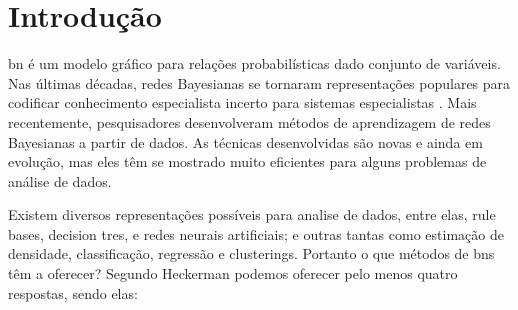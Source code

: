 \chapter{Introdução}%
\gls{bn} é um modelo gráfico para relações probabilísticas dado conjunto de variáveis. Nas últimas décadas, redes Bayesianas se tornaram representações populares para codificar conhecimento especialista incerto para sistemas especialistas \cite{heck95}. Mais recentemente, pesquisadores desenvolveram métodos de aprendizagem de redes Bayesianas a partir de dados. As técnicas desenvolvidas são novas e ainda em evolução, mas eles têm se mostrado muito eficientes para alguns problemas de análise de dados.

Existem diversos representações possíveis para analise de dados, entre elas, rule bases, decision tres, e redes neurais artificiais; e outras tantas como estimação de densidade, classificação, regressão e clusterings. Portanto o que métodos de \glspl{bn} têm a oferecer? Segundo Heckerman \cite{heck95} podemos oferecer pelo menos quatro respostas, sendo elas:

